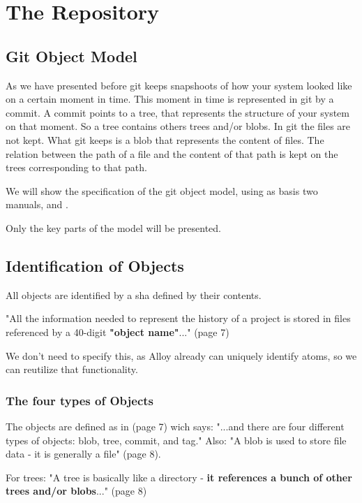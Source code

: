 \section{The Repository}
\subsection{Git Object Model}

As we have presented before git keeps snapshoots of how your system
looked like on a certain moment in time. This moment in time is
represented in git by a commit. A commit points to a tree, that
represents the structure of your system on that moment. So a tree
contains others trees and/or blobs. In git the files are not kept. 
What git keeps is a blob that represents the content of files. The
relation between the path of a file and the content of that path 
is kept on the trees corresponding to that path.

We will show the 
specification of the git object model, using as
basis two manuals, \cite{gitComm} and \cite{progit}. \par
Only the key parts of the model will be presented. \par

\subsection{Identification of Objects}

All objects are identified by a sha defined by their contents. \par
"All the information needed to represent the history
of a project is stored in files referenced by a 
40-digit {\bf "object name"}..." (page 7) \par
We don't need to specify this, as Alloy already can uniquely
identify atoms, so we can reutilize that functionality. \par


\subsubsection{The four types of Objects}

The objects are defined as in \cite{gitComm} (page 7) wich says: 
"...and there are four different types of objects: blob,
tree, commit, and tag."
Also: "A blob is used to store file data - it is generally a file" 
\cite{gitComm} (page 8). \par
For trees: "A tree is basically like a directory 
- {\bf it references a bunch
of other trees and/or blobs}..." (page 8) \par 

